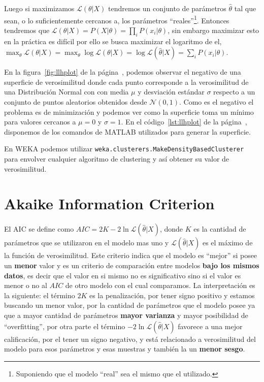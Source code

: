 \documentclass[10pt,a4paper]{article}
\begin{document}
Luego si maximizamos $\mathcal{L}(\theta|X)$ tendremos un conjunto de parámetros $\hat{\theta}$ tal que sean, o lo suficientemente cercanos a, los parámetros ``reales''\footnote{Suponiendo que el modelo ``real'' sea el mismo que el utilizado.}. Entonces tendremos que $\mathcal{L}(\theta|X) = P(X|\theta) = \prod_i P(x_i|\theta)$, sin embargo maximizar esto en la práctica es difícil por ello se busca maximizar el logaritmo de el, $\max_\theta \mathcal{L}(\theta|X) = \max_\theta \log \mathcal{L}(\theta|X) = \log \mathcal{L}(\hat{\theta}|X)= \sum_i P(x_i|\theta)$.

En la figura~\ref{fig:llhplot} de la página~\pageref{fig:llhplot}, podemos observar el negativo de una superficie de verosimilitud donde cada punto corresponde a la verosimilitud de una Distribución Normal con con media $\mu$ y desviación estándar $\sigma$ respecto a un conjunto de puntos aleatorios obtenidos desde $\mathcal{N}(0, 1)$. Como es el negativo el problema es de minimización y podemos ver como la superficie toma un mínimo para valores cercanos a $\mu=0$ y $\sigma=1$. En el código~\ref{lst:llhplot} de la página~\pageref{lst:llhplot}, disponemos de los comandos de MATLAB utilizados para generar la superficie.

En WEKA podemos utilizar \lstinline{weka.clusterers.MakeDensityBasedClusterer} para envolver cualquier algoritmo de clustering y así obtener su valor de verosimilitud.



\section{Akaike Information Criterion}\label{modelselection_aic}
El AIC se define como $AIC = 2K - 2\ln{\mathcal{L}(\hat{\theta}|X)}$, donde $K$ es la cantidad de parámetros que se utilizaron en el modelo mas uno y $\mathcal{L}(\hat{\theta}|X)$ es el máximo de la función de verosimilitud. Este criterio indica que el modelo es ``mejor'' si posee un \textbf{menor} valor y es un criterio de comparación entre modelos \textbf{bajo los mismos datos}, es decir que el valor en si mismo no es significativo sino si el valor es menor o no al $AIC$ de otro modelo con el cual comparamos. La interpretación es la siguiente: el término $2K$ es la penalización, por tener signo positivo y estamos buscando un menor valor, por la cantidad de parámetros que el modelo posee ya que a mayor cantidad de parámetros \textbf{mayor varianza} y mayor posibilidad de ``overfitting'', por otra parte el término $-2 \ln{\mathcal{L}(\hat{\theta}|X)}$ favorece a una mejor calificación, por el tener un signo negativo, y está relacionado a verosimilitud del modelo para esos parámetros y esas muestras y también la un \textbf{menor sesgo}\cite{Hu07}.
\end{document}
